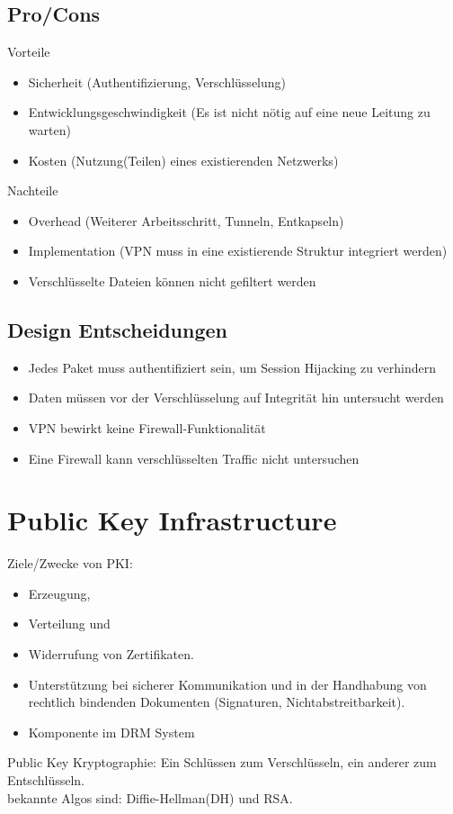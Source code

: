 \documentclass{article} %
\begin{document}
\subsection{Pro/Cons}
Vorteile
	\begin{itemize}
	\item Sicherheit (Authentifizierung, Verschlüsselung)
	\item Entwicklungsgeschwindigkeit (Es ist nicht nötig auf eine neue Leitung zu warten)
	\item Kosten (Nutzung(Teilen) eines existierenden Netzwerks)
	\end{itemize}
Nachteile
	\begin{itemize}
	\item Overhead (Weiterer Arbeitsschritt, Tunneln, Entkapseln)
	\item Implementation (VPN muss in eine existierende Struktur integriert werden)
	\item Verschlüsselte Dateien können nicht gefiltert werden 
	\end{itemize}
\subsection{Design Entscheidungen}
	\begin{itemize}
	\item Jedes Paket muss authentifiziert sein, um Session Hijacking zu verhindern
	\item Daten müssen vor der Verschlüsselung auf Integrität hin untersucht werden
	\item VPN bewirkt keine Firewall-Funktionalität
	\item Eine Firewall kann verschlüsselten Traffic nicht untersuchen
	\end{itemize}
\section{Public Key Infrastructure}
Ziele/Zwecke von PKI:
\begin{itemize}
	\item Erzeugung,
    \item Verteilung und
    \item Widerrufung von Zertifikaten.\\
    \item Unterstützung bei sicherer Kommunikation und in der Handhabung von rechtlich bindenden Dokumenten (Signaturen, Nichtabstreitbarkeit).
    \item Komponente im DRM System
\end{itemize}
Public Key Kryptographie: Ein Schlüssen zum Verschlüsseln, ein anderer zum Entschlüsseln.\\
bekannte Algos sind: Diffie-Hellman(DH) und RSA.\\
\end{document}

